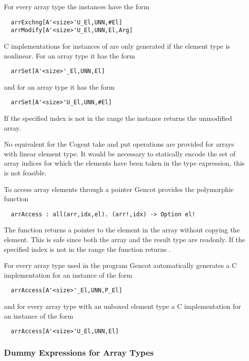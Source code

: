 For every array type  the instances have the form
\begin{verbatim}
  arrExchng[A'<size>'U_El,UNN,#El]
  arrModify[A'<size>'U_El,UNN,El,Arg]
\end{verbatim}

C implementations for instances of  are only generated if the element type is nonlinear. For an array type
 it has the form
\begin{verbatim}
  arrSet[A'<size>'_El,UNN,El]
\end{verbatim}
and for an array type  it has the form
\begin{verbatim}
  arrSet[A'<size>'U_El,UNN,#El]
\end{verbatim}
If the specified index is not in the range  the instance returns the unmodified array.

No equivalent for the Cogent take and put operations are provided for arrays with linear element type. It would be
necessary to statically encode the set of array indices for which the elements have been taken in the type expression,
this is not feasible.

To access array elements through a pointer Gencot provides the polymorphic function
\begin{verbatim}
  arrAccess : all(arr,idx,el). (arr!,idx) -> Option el!
\end{verbatim}
The function returns a pointer to the element in the array without copying the element. This is safe since both the array and the result
type are readonly. If the specified index is not in the range  the function returns . 

For every array type  used in the program Gencot automatically generates a C implementation
for an instance of the form
\begin{verbatim}
  arrAccess[A'<size>'_El,UNN,P_El]
\end{verbatim}
and for every array type  with an unboxed element type a C implementation for an
instance of the form
\begin{verbatim}
  arrAccess[A'<size>'U_El,UNN,El]
\end{verbatim}

\subsubsection{Dummy Expressions for Array Types}

